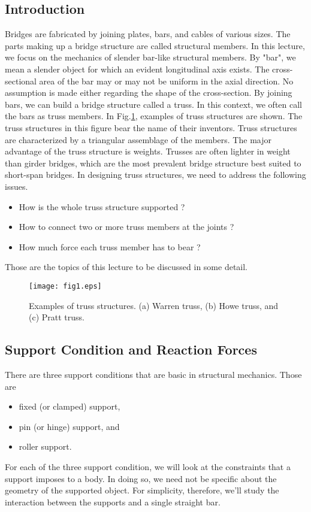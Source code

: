 ﻿\documentclass[10pt,a4j]{article}
\begin{document}
\subsection{Introduction}
Bridges are fabricated by joining plates, bars, and cables of various sizes. The parts making up a bridge structure are called structural members. In this lecture, we focus on the mechanics of slender bar-like structural members. By "bar", we mean a slender object for which an evident longitudinal axis exists. The cross-sectional area of the bar may or may not be uniform in the axial direction. No assumption is made either regarding the shape of the cross-section. By joining bars, we can build a bridge structure called a truss. In this context, we often call the bars as truss members. In Fig.\ref{fig:fig1}, examples of truss structures are shown. The truss structures in this figure bear the name of their inventors. Truss structures are characterized by a triangular assemblage of the members. The major advantage of the truss structure is weights. Trusses are often lighter in weight than girder bridges, which are the most prevalent bridge structure best suited to short-span bridges. In designing truss structures, we need to address the following issues.
\begin{itemize}
\item
	How is the whole truss structure supported ?
\item
	How to connect two or more truss members at the joints ?
\item
	How much force each truss member has to bear ?
\end{itemize}
Those are the topics of this lecture to be discussed in some detail. 
\begin{figure}[h]
	\begin{center}
	\texttt{[image: fig1.eps]} 
	\end{center}
	\caption{Examples of truss structures. (a) Warren truss, (b) Howe truss, and (c) Pratt truss.} 
	\label{fig:fig1}
\end{figure}
\subsection{Support Condition and Reaction Forces}
There are three support conditions that are basic in structural mechanics. 
Those are 
\begin{itemize}
\item
	fixed (or clamped) support,
\item
	pin (or hinge) support, and 
\item
	roller support.
\end{itemize}
For each of the three support condition, we will look at the constraints that a support 
imposes to a body. In doing so, we need not be specific about the geometry of the 
supported object. For simplicity, therefore, we'll study the interaction between 
the supports and a single straight bar. 
\end{document}
